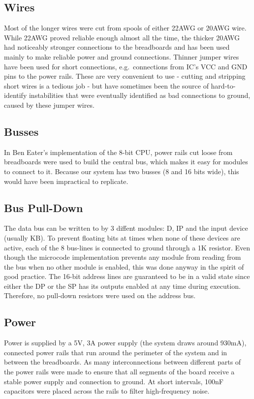 \subsection{Wires} Most of the longer wires were cut from spools of either 22AWG or 20AWG wire. While 22AWG proved reliable enough almost all the time, the thicker 20AWG had noticeably stronger connections to the breadboards and has been used mainly to make reliable power and ground connections. Thinner jumper wires have been used for short connections, e.g.~connections from IC's VCC and GND pins to the power rails. These are very convenient to use - cutting and stripping short wires is a tedious job - but have sometimes been the source of hard-to-identify instabilities that were eventually identified as bad connections to ground, caused by these jumper wires.

\subsection{Busses}
In Ben Eater's implementation of the 8-bit CPU, power rails cut loose from breadboards were used to build the central bus, which makes it easy for modules to connect to it. Because our system has two busses (8 and 16 bits wide), this would have been impractical to replicate.

\subsection{Bus Pull-Down}
The data bus can be written to by 3 diffent modules: D, IP and the input device (usually KB). To prevent floating bits at times when none of these devices are active, each of the 8 bus-lines is connected to ground through a 1K resistor. Even though the microcode implementation prevents any module from reading from the bus when no other module is enabled, this was done anyway in the spirit of good practice. The 16-bit address lines are guaranteed to be in a valid state since either the DP or the SP has its outputs enabled at any time during execution. Therefore, no pull-down resistors were used on the address bus.

\subsection{Power}
Power is supplied by a 5V, 3A power supply (the system draws around 930mA), connected power rails that run around the perimeter of the system and in between the breadboards. As many interconnections between different parts of the power rails were made to ensure that all segments of the board receive a stable power supply and connection to ground. At short intervals, 100nF capacitors were placed across the rails to filter high-frequency noise.

